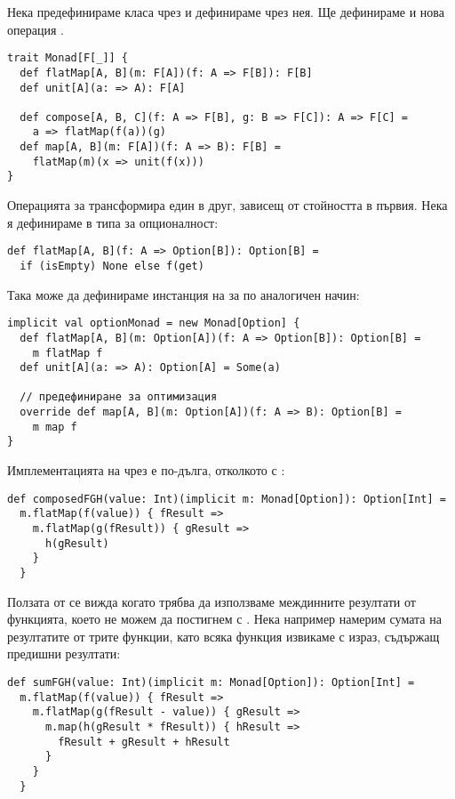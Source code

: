 Нека предефинираме класа  чрез  и дефинираме  чрез нея. Ще дефинираме и нова операция .

\begin{lstlisting}
trait Monad[F[_]] {
  def flatMap[A, B](m: F[A])(f: A => F[B]): F[B]
  def unit[A](a: => A): F[A]

  def compose[A, B, C](f: A => F[B], g: B => F[C]): A => F[C] =
    a => flatMap(f(a))(g)
  def map[A, B](m: F[A])(f: A => B): F[B] =
    flatMap(m)(x => unit(f(x)))
}
\end{lstlisting}

Операцията  за  трансформира един  в друг, зависещ от стойността в първия. Нека я дефинираме в типа за опционалност:

\begin{lstlisting}
def flatMap[A, B](f: A => Option[B]): Option[B] =
  if (isEmpty) None else f(get)
\end{lstlisting}

Така може да дефинираме инстанция на  за  по аналогичен начин:

\begin{lstlisting}[texcl=true]
implicit val optionMonad = new Monad[Option] {
  def flatMap[A, B](m: Option[A])(f: A => Option[B]): Option[B] =
    m flatMap f
  def unit[A](a: => A): Option[A] = Some(a)
  
  // предефиниране за оптимизация
  override def map[A, B](m: Option[A])(f: A => B): Option[B] =
    m map f
}
\end{lstlisting}

Имплементацията на  чрез  е по-дълга, отколкото с :

\begin{lstlisting}
def composedFGH(value: Int)(implicit m: Monad[Option]): Option[Int] =
  m.flatMap(f(value)) { fResult =>
    m.flatMap(g(fResult)) { gResult =>
      h(gResult)
    }
  }
\end{lstlisting}

Ползата от  се вижда когато трябва да използваме междинните резултати от функцията, което не можем да постигнем с . Нека например намерим сумата на резултатите от трите функции, като всяка функция извикаме с израз, съдържащ предишни резултати:

\begin{lstlisting}
def sumFGH(value: Int)(implicit m: Monad[Option]): Option[Int] =
  m.flatMap(f(value)) { fResult =>
    m.flatMap(g(fResult - value)) { gResult =>
      m.map(h(gResult * fResult)) { hResult =>
        fResult + gResult + hResult
      }
    }
  }
\end{lstlisting}

